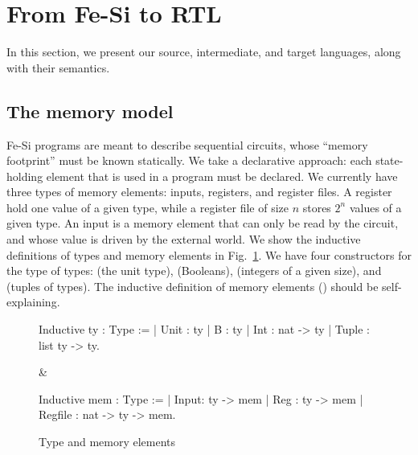 \documentclass[preprint]{sigplanconf}
\newcommand{\denote}[1]{\llbracket #1 \rrbracket}
\begin{document}
\section{From Fe-Si to RTL}
In this section, we present our source, intermediate, and target
languages, along with their semantics.
%

\subsection{The memory model}
Fe-Si programs are meant to describe sequential circuits, whose
``memory footprint'' must be known statically. We take a declarative
approach: each state-holding element that is used in a program must be
declared. 
%
We currently have three types of memory elements: inputs, registers,
and register files. A register hold one value of a given type, while a
register file of size $n$ stores $2^n$ values of a given type. 
%
An input is a memory element that can only be read by the circuit,
and whose value is driven by the external world.
%
We show the inductive definitions of types and memory elements in
Fig.~\ref{fig:type}. 
%
We have four constructors for the type  of types: 
(the unit type),  (Booleans),  (integers of a given
size), and  (tuples of types). The inductive definition of
memory elements () should be self-explaining. 

\begin{figure}
  \centering
\begin{twolistings}
\begin{coq}
Inductive ty : Type :=
| Unit : ty 
| B : ty 
| Int : nat -> ty
| Tuple : list ty -> ty.     
\end{coq}&
\begin{coq}
Inductive mem : Type :=
| Input: ty ->  mem
| Reg : ty -> mem
| Regfile : nat -> ty -> mem. 
$ $
\end{coq}
\end{twolistings}
\caption{Type and memory elements}
  \label{fig:type}
\end{figure}

\newcommand{\denotety}[1]{\denote{\mathtt{#1}}_{\mathtt{ty}}}
\newcommand{\denotemem}[1]{\denote{\mathtt{#1}}_{\mathtt{mem}}}
\end{document}
